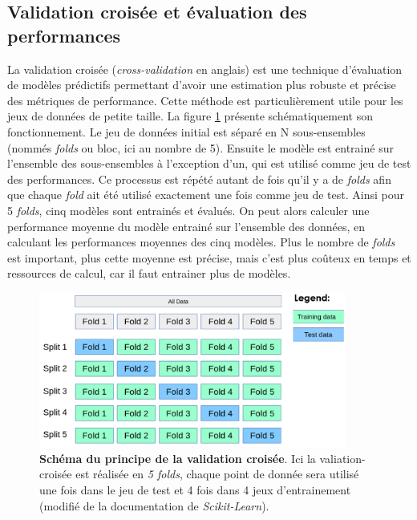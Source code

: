 \subsection{Validation croisée et évaluation des performances}
La validation croisée (\textit{cross-validation} en anglais) est une technique d'évaluation de modèles prédictifs permettant d'avoir une estimation plus robuste et précise des métriques de performance. Cette méthode est particulièrement utile pour les jeux de données de petite taille. La figure \ref{fig:cross-val} présente schématiquement son fonctionnement. Le jeu de données initial est séparé en N sous-ensembles (nommés \textit{folds} ou bloc, ici au nombre de 5). Ensuite le modèle est entrainé sur l'ensemble des sous-ensembles à l'exception d’un, qui est utilisé comme jeu de test des performances. Ce processus est répété autant de fois qu'il y a de \textit{folds} afin que chaque \textit{fold} ait été utilisé exactement une fois comme jeu de test. Ainsi pour 5 \textit{folds}, cinq modèles sont entrainés et évalués. On peut alors calculer une performance moyenne du modèle entrainé sur l'ensemble des données, en calculant les performances moyennes des cinq modèles. Plus le nombre de \textit{folds} est important, plus cette moyenne est précise, mais c'est plus coûteux en temps et ressources de calcul, car il faut entrainer plus de modèles.
\begin{figure}[!htbp]
 \centering
 \includegraphics[width=0.9\textwidth]{figures/cross-val.png}
 \caption[Schéma validation-croisée]{\textbf{Schéma du principe de la validation croisée}. Ici la valiation-croisée est réalisée en \textit{5 folds}, chaque point de donnée sera utilisé une fois dans le jeu de test et 4 fois dans 4 jeux d'entrainement (modifié de la documentation de \textit{Scikit-Learn}).}
 \label{fig:cross-val}
\end{figure}
